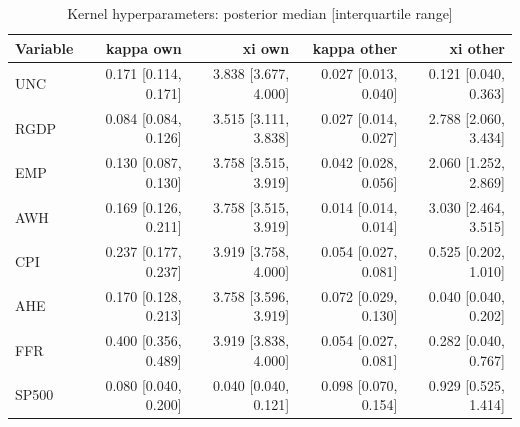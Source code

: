 \begin{table}[htbp]
\centering
\caption{Kernel hyperparameters: posterior median [interquartile range]}
\label{tab:hyper}
\begin{tabular}{lrrrr}
\toprule
Variable & kappa own & xi own & kappa other & xi other \\
\midrule
UNC & 0.171 [0.114, 0.171] & 3.838 [3.677, 4.000] & 0.027 [0.013, 0.040] & 0.121 [0.040, 0.363] \\
RGDP & 0.084 [0.084, 0.126] & 3.515 [3.111, 3.838] & 0.027 [0.014, 0.027] & 2.788 [2.060, 3.434] \\
EMP & 0.130 [0.087, 0.130] & 3.758 [3.515, 3.919] & 0.042 [0.028, 0.056] & 2.060 [1.252, 2.869] \\
AWH & 0.169 [0.126, 0.211] & 3.758 [3.515, 3.919] & 0.014 [0.014, 0.014] & 3.030 [2.464, 3.515] \\
CPI & 0.237 [0.177, 0.237] & 3.919 [3.758, 4.000] & 0.054 [0.027, 0.081] & 0.525 [0.202, 1.010] \\
AHE & 0.170 [0.128, 0.213] & 3.758 [3.596, 3.919] & 0.072 [0.029, 0.130] & 0.040 [0.040, 0.202] \\
FFR & 0.400 [0.356, 0.489] & 3.919 [3.838, 4.000] & 0.054 [0.027, 0.081] & 0.282 [0.040, 0.767] \\
SP500 & 0.080 [0.040, 0.200] & 0.040 [0.040, 0.121] & 0.098 [0.070, 0.154] & 0.929 [0.525, 1.414] \\
\bottomrule
\end{tabular}
\end{table}